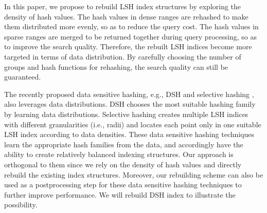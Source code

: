 In this paper, we propose to rebuild LSH index structures by exploring the density of hash values. The hash values in dense ranges are rehashed to make them distributed more evenly, so as to reduce the query cost. The hash values in sparse ranges are merged to be returned together during query processing, so as to improve the search quality. Therefore, the rebuilt LSH indices become more targeted in terms of data distribution. By carefully choosing the number of groups and hash functions for rehashing, the search quality can still be guaranteed.



 The recently proposed data sensitive hashing, e.g., DSH \cite{Gao:2014:DDS:2588555.2588565} and selective hashing \cite{Gao:2015:SHC:2783258.2783284}, also leverages data distributions. DSH \cite{Gao:2014:DDS:2588555.2588565} chooses the most suitable hashing family by learning data distributions. Selective hashing \cite{Gao:2015:SHC:2783258.2783284} creates multiple LSH indices with different granularities (i.e., radii) and locates each point only in one suitable LSH index according to data densities. These data sensitive hashing techniques learn the appropriate hash families from the data, and accordingly have the ability to create relatively balanced indexing structures. Our approach is orthogonal to them since we rely on the density of hash values and directly rebuild the existing index structures. Moreover, our rebuilding scheme can also be used as a postprocessing step for these data sensitive hashing techniques to further improve performance. We will rebuild DSH index to illustrate the possibility.


